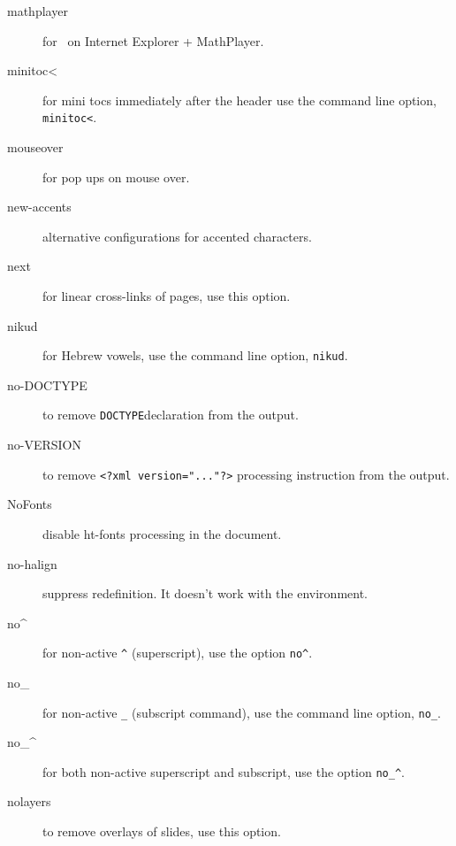 \begin{description}
\item[mathplayer] for \mathml\ on Internet Explorer + MathPlayer.

\item[minitoc\textless] for mini tocs immediately after the header use the
  command line option, \verb=minitoc<=.

\item[mouseover] for pop ups on mouse over.

\item[new-accents] alternative configurations for accented characters. 

\item[next] for linear cross-links of pages, use this option.

\item[nikud] for Hebrew vowels, use the command line option,
  \verb=nikud=.

\item[no-DOCTYPE] to remove \texttt{DOCTYPE}\space declaration from
  the output.

\item[no-VERSION] to remove \verb+<?xml version="..."?>+ processing
  instruction from the output.

\item[NoFonts] disable ht-fonts processing in the document.

\item[no-halign] suppress \texcommand{\halign} redefinition. It doesn't work with the  environment.

\item[no\textasciicircum] for non-active \verb=^= (superscript), use the option
  \verb=no^=.

\item[no\_] for non-active \verb=_= (subscript command), use the
  command line option, \verb=no_=.

\item[no\_\textasciicircum] for both non-active superscript and subscript, use the
  option \verb=no_^=.

\item[nolayers] to remove overlays of slides, use this option.


\end{description}
